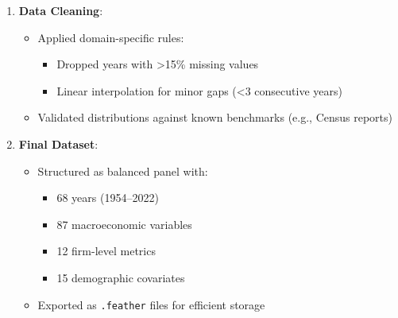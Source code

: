 \begin{enumerate}
    \item \textbf{Data Cleaning}:
    \begin{itemize}
        \item Applied domain-specific rules:
        \begin{itemize}
            \item Dropped years with >15\% missing values
            \item Linear interpolation for minor gaps (<3 consecutive years)
        \end{itemize}
        \item Validated distributions against known benchmarks (e.g., Census reports)
    \end{itemize}
    
    \item \textbf{Final Dataset}:
    \begin{itemize}
        \item Structured as balanced panel with:
        \begin{itemize}
            \item 68 years (1954--2022)
            \item 87 macroeconomic variables
            \item 12 firm-level metrics
            \item 15 demographic covariates
        \end{itemize}
        \item Exported as \texttt{.feather} files for efficient storage
    \end{itemize}
\end{enumerate}


